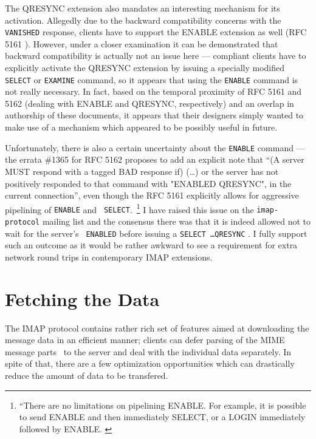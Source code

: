 \documentclass[trojita]{subfiles}
\begin{document}
The QRESYNC extension also mandates an interesting mechanism for its activation.  Allegedly due to the backward
compatibility concerns with the {\tt VANISHED} response, clients have to support the ENABLE extension as well (RFC 5161
\cite{rfc5161}).  However, under a closer examination it can be demonstrated that backward compatibility is actually not
an issue here --- compliant clients have to explicitly activate the QRESYNC extension by issuing a specially modified
{\tt SELECT} or {\tt EXAMINE} command, so it appears that using the {\tt ENABLE} command is not really necessary.  In
fact, based on the temporal proximity of RFC 5161 and 5162 (dealing with ENABLE and QRESYNC, respectively) and an
overlap in authorship of these documents, it appears that their designers simply wanted to make use of a mechanism which
appeared to be possibly useful in future.

Unfortunately, there is also a certain uncertainty about the {\tt ENABLE} command --- the errata \#1365 for RFC 5162
\cite{rfc5162-errata} proposes to add an explicit note that ``(A server MUST respond with a tagged BAD
response if) (\ldots) or the server has not positively responded to that command with "ENABLED QRESYNC", in the current
connection'', even though the RFC 5161 explicitly allows for aggressive pipelining of {\tt ENABLE} and {\tt
SELECT}.~\footnote{``There are no limitations on pipelining ENABLE.  For example, it is possible to send ENABLE and then
immediately SELECT, or a LOGIN immediately followed by ENABLE. \cite[p. 2]{rfc5161}}  I have raised this issue on the
{\tt imap-protocol} mailing list and the consensus there was that it is indeed allowed not to wait for the server's {\tt
ENABLED} before issuing a {\tt SELECT \ldots QRESYNC} \cite{melnikov-qresync-enable}.  I fully support such an outcome
as it would be rather awkward to see a requirement for extra network round trips in contemporary IMAP extensions.

\section{Fetching the Data}

The IMAP protocol contains rather rich set of features aimed at downloading the message data in an efficient manner;
clients can defer parsing of the MIME message parts~\cite{rfc2045} to the server and deal with the individual data
separately.  In spite of that, there are a few optimization opportunities which can drastically reduce the amount of
data to be transfered.
\end{document}
